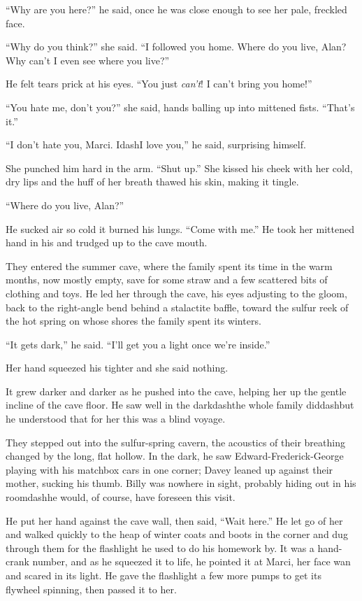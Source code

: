 ``Why are you here?'' he said, once he was close enough to see her
pale, freckled face.

``Why do you think?'' she said.  ``I followed you home.  Where do you
live, Alan?  Why can't I even see where you live?''

He felt tears prick at his eyes.  ``You just \textit{can't}!  I can't
bring you home!''

``You hate me, don't you?'' she said, hands balling up into mittened
fists.  ``That's it.''

``I don't hate you, Marci.  Idash{}I love you,'' he said, surprising
himself.

She punched him hard in the arm.  ``Shut up.'' She kissed his cheek
with her cold, dry lips and the huff of her breath thawed his skin,
making it tingle.

``Where do you live, Alan?''

He sucked air so cold it burned his lungs.  ``Come with me.'' He took
her mittened hand in his and trudged up to the cave mouth.

They entered the summer cave, where the family spent its time in the
warm months, now mostly empty, save for some straw and a few scattered
bits of clothing and toys.  He led her through the cave, his eyes
adjusting to the gloom, back to the right-angle bend behind a
stalactite baffle, toward the sulfur reek of the hot spring on whose
shores the family spent its winters.

``It gets dark,'' he said.  ``I'll get you a light once we're
inside.''

Her hand squeezed his tighter and she said nothing.

It grew darker and darker as he pushed into the cave, helping her up
the gentle incline of the cave floor.  He saw well in the darkdash{}the
whole family diddash{}but he understood that for her this was a blind
voyage.

They stepped out into the sulfur-spring cavern, the acoustics of their
breathing changed by the long, flat hollow.  In the dark, he saw
Edward-Frederick-George playing with his matchbox cars in one corner;
Davey leaned up against their mother, sucking his thumb.  Billy was
nowhere in sight, probably hiding out in his roomdash{}he would, of
course, have foreseen this visit.

He put her hand against the cave wall, then said, ``Wait here.'' He
let go of her and walked quickly to the heap of winter coats and boots
in the corner and dug through them for the flashlight he used to do
his homework by.  It was a hand-crank number, and as he squeezed it to
life, he pointed it at Marci, her face wan and scared in its light. 
He gave the flashlight a few more pumps to get its flywheel spinning,
then passed it to her.

